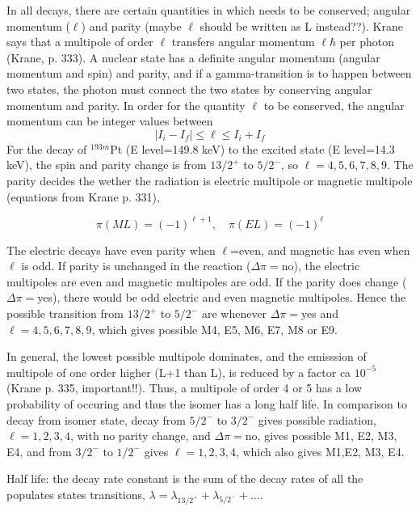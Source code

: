 \documentclass[a4paper,11pt,twoside]{book}
\begin{document}
In all decays, there are certain quantities in which needs to be conserved; angular momentum ($\ell$) and parity (maybe $\ell$ should be written as L instead??). Krane says that a multipole of order $\ell$ transfers angular momentum $\ell\hbar$ per photon (Krane, p. 333). A nuclear state has a definite angular momentum (angular momentum and spin) and parity, and if a gamma-transition is to happen between two states, the photon must connect the two states by conserving angular momentum and parity. In order for the quantity $\ell$ to be conserved, the angular momentum can be integer values between
\begin{equation}
|I_i-I_f| \leq \ell \leq I_i + I_f
\end{equation}
For the decay of $^{193m}$Pt (E level=149.8 keV) to the excited state (E level=14.3 keV), the spin and parity change is from $13/2^+$ to $5/2^-$, so $\ell=4,5,6,7,8,9$. The parity decides the wether the radiation is electric multipole or magnetic multipole (equations from Krane p. 331), 

\begin{equation}
    \pi(ML) = (-1)^{\ell+1}, \quad \pi(EL)=(-1)^{\ell}
\end{equation}
 
The electric decays have even parity when $\ell$=even, and magnetic has even when $\ell$ is odd. If parity is unchanged in the reaction ($\Delta \pi=$no), the electric multipoles are even and magnetic multipoles are odd. If the parity does change ($\Delta\pi=$yes), there would be odd electric and even magnetic multipoles. Hence the possible transition from $13/2^+$ to $5/2^-$ are whenever $\Delta \pi=$yes and $\ell=4,5,6,7,8,9$, which gives possible M4, E5, M6, E7, M8 or E9. 

In general, the lowest possible multipole dominates, and the emisssion of multipole of one order higher (L+1 than L), is reduced by a factor ca $10^{-5}$ (Krane p. 335, important!!). Thus, a multipole of order 4 or 5 has a low probability of occuring and thus the isomer has a long half life.  
In comparison to decay from isomer state, decay from $5/2^-$ to $3/2^-$ gives possible radiation, $\ell=1,2,3,4$, with no parity change, and $\Delta \pi=$no, gives possible M1, E2, M3, E4, and from $3/2^-$ to $1/2^-$ gives $\ell=1,2,3,4$, which also gives M1,E2, M3, E4. 

Half life: the decay rate constant is the sum of the decay rates of all the populates states  transitions, $\lambda=\lambda_{13/2^+} + \lambda_{5/2^-}+ ...$. 
\end{document}
